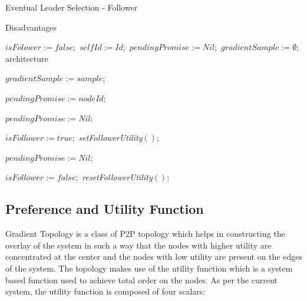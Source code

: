 \documentclass[a4paper,11pt]{kth-mag}
\begin{document}
\begin{algorithm}[h]
\caption{Eventual Leader Selection - Follower}
\label{follower}Disadvantages
\begin{algorithmic}[1]

  \State $isFolower := false;$
  \State $selfId := Id;$ $pendingPromise := Nil;$
  \State $gradientSample := \emptyset;$architecture
\EndUponS

  \State $gradientSample := sample;$
 \EndUpon

    \State $pendingPromise := nodeId;$
    \EndTrigger
    \TriggerS[promiseTimeout]{}\EndTriggerS
  \Else
     \EndTrigger
  \EndIf
\EndUpon

\UponS[promiseTimeout]{}
  \State $pendingPromise := Nil;$
\EndUponS

    \TriggerS[followerLeaseTimeout]{}\EndTriggerS
    \TriggerS[cancelPromiseTimeout]{}\EndTriggerS
    \State $isFollower := true;$
    \State \emph{setFollowerUtility}$();$
  \EndIf
\EndUpon

\UponS[promiseTimeout]{}
  \State $pendingPromise := Nil;$
\EndUponS

\UponS[leaseTimeout]{}
  \State $isFollower := false;$
  \State \emph{resetFollowerUtility}$();$
\EndUponS

\end{algorithmic}
\end{algorithm}





\subsection{Preference and Utility Function}
\label{ssec:utility}

Gradient Topology is a class of P2P topology which helps in constructing the overlay of the system in such a way that the nodes with higher utility are concentrated at the center and the nodes with low utility are present on the edges of the system. The topology makes use of the utility function which is a system based function used to achieve total order on the nodes. As per the current system, the utility function is composed of four scalars:
\end{document}
